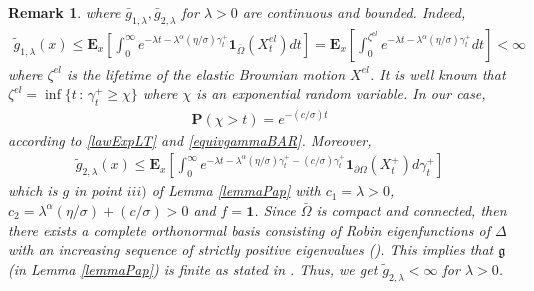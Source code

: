 \documentclass[11pt,a4paper]{article}
\newtheorem{remark}{Remark}[section]
\begin{document}
\begin{remark}
where $\bar{g}_{1,\lambda}, \bar{g}_{2,\lambda}$ for $\lambda>0$ are continuous and bounded. Indeed, 
\begin{align*}
\tilde{g}_{1,\lambda}(x) \leq \mathbf{E}_x\left[ \int_0^\infty e^{-\lambda t - \lambda^\alpha (\eta/\sigma)\gamma^+_t} \mathbf{1}_{\bar{\Omega}}(X^{el}_t) dt \right] = \mathbf{E}_x\left[ \int_0^{\zeta^{el}} e^{-\lambda t - \lambda^\alpha (\eta/\sigma)\gamma^+_t} dt \right] < \infty
\end{align*}
where $\zeta^{el}$ is the lifetime of the elastic Brownian motion $X^{el}$. It is well known that $\zeta^{el} = \inf\{t\,:\, \gamma^+_t \geq \chi\}$ where $\chi$ is an exponential random variable. In our case, 
\begin{align*}
\mathbf{P}(\chi >t) = e^{-(c/\sigma) t}
\end{align*}
according to \eqref{lawExpLT} and \eqref{equivgammaBAR}. Moreover,
\begin{align*}
\tilde{g}_{2,\lambda}(x) \leq \mathbf{E}_x\left[ \int_0^\infty e^{-\lambda t - \lambda^\alpha (\eta/\sigma)\gamma^+_t - (c/\sigma) \gamma^+_t} \mathbf{1}_{\partial \Omega}(X^+_t) d\gamma^+_t \right]
\end{align*}
which is $g$ in point $iii)$ of Lemma \ref{lemmaPap} with $c_1=\lambda>0$, $c_2 =\lambda^\alpha (\eta/\sigma) + (c/\sigma)>0$ and $f=\mathbf{1}$. Since $\bar{\Omega}$ is compact and connected, then there exists a complete orthonormal basis consisting of Robin eigenfunctions of $\Delta$ with an increasing sequence of strictly positive eigenvalues (\cite[page 8]{Chav84}). This implies that $\mathfrak{g}$ (in Lemma \ref{lemmaPap}) is finite as stated in \cite[Theorem 3.7]{Pap90}. Thus, we get $\tilde{g}_{2,\lambda} < \infty$ for $\lambda>0$. \\



\end{remark}
\end{document}
